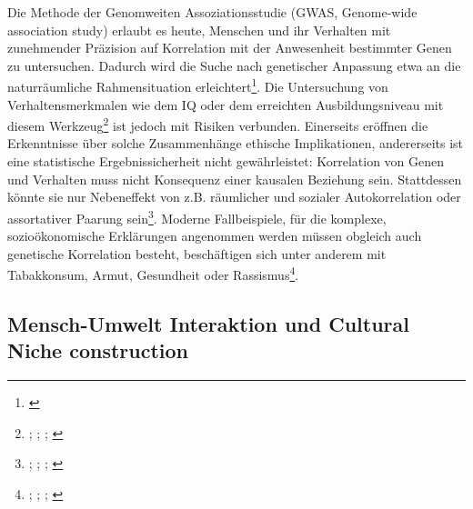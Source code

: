 \documentclass[openany,twoside,twocolumn]{book}
\let\rmarkdownfootnote\footnote%
\def\footnote{\protect\rmarkdownfootnote}
\begin{document}
Die Methode der Genomweiten Assoziationsstudie (GWAS, Genome-wide
association study) erlaubt es heute, Menschen und ihr Verhalten mit
zunehmender Präzision auf Korrelation mit der Anwesenheit bestimmter
Genen zu untersuchen. Dadurch wird die Suche nach genetischer Anpassung
etwa an die naturräumliche Rahmensituation erleichtert\footnote{\textcite{berg_population_2014}}.
Die Untersuchung von Verhaltensmerkmalen wie dem IQ oder dem erreichten
Ausbildungsniveau mit diesem Werkzeug\footnote{\textcite{benyamin_childhood_2014};
  \textcite{davies_genome-wide_2011}; \textcite{minkov_genetic_2015};
  \textcite{okbay_genome-wide_2016}} ist jedoch mit Risiken verbunden.
Einerseits eröffnen die Erkenntnisse über solche Zusammenhänge ethische
Implikationen, andererseits ist eine statistische Ergebnissicherheit
nicht gewährleistet: Korrelation von Genen und Verhalten muss nicht
Konsequenz einer kausalen Beziehung sein. Stattdessen könnte sie nur
Nebeneffekt von z.B. räumlicher und sozialer Autokorrelation oder
assortativer Paarung sein\footnote{\textcite{abdellaoui_educational_2015};
  \textcite{domingue_genetic_2014}; \textcite{okbay_genome-wide_2016};
  \textcite{piffer_review_2015}}. Moderne Fallbeispiele, für die
komplexe, sozioökonomische Erklärungen angenommen werden müssen obgleich
auch genetische Korrelation besteht, beschäftigen sich unter anderem mit
Tabakkonsum, Armut, Gesundheit oder Rassismus\footnote{\textcite{maes_genetic_2006};
  \textcite{marden_african_2016};
  \textcite{nugent_geneenvironment_2011};
  \textcite{paradies_racism_2015}}.

\hypertarget{mensch-umwelt-interaktion-und-cultural-niche-construction}{%
\subsection{Mensch-Umwelt Interaktion und Cultural Niche
construction}\label{mensch-umwelt-interaktion-und-cultural-niche-construction}}
\end{document}
